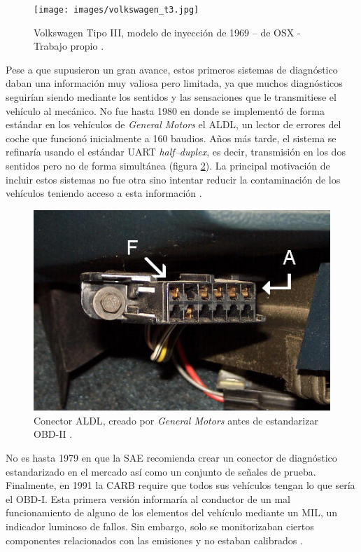 \begin{figure}[H]
  \centering
  \texttt{[image: images/volkswagen\_t3.jpg]}
  \caption{Volkswagen Tipo III, modelo de inyección de 1969 -- de OSX - Trabajo propio \cite{VolkswagenTipo2021}.}
  \label{fig:volkswagen_t3}
\end{figure}

Pese a que supusieron un gran avance, estos primeros sistemas de
diagnóstico daban una información muy valiosa pero limitada, ya que muchos
diagnósticos seguirían siendo mediante los sentidos y las sensaciones
que le transmitiese el vehículo al mecánico. No fue hasta 1980 en donde
se implementó de forma estándar en los vehículos de \textit{General Motors}
el \ac{ALDL}, un lector de errores del coche que funcionó inicialmente a
160 baudios. Años más tarde, el sistema se refinaría usando el estándar
\ac{UART} \textit{half--duplex}, es decir, transmisión en los dos sentidos pero
no de forma simultánea (figura \ref{fig:aldl}). La principal motivación de incluir estos sistemas no fue
otra sino intentar reducir la contaminación de los vehículos teniendo
acceso a esta información \cite{SistemaOBD2Historia}.

\begin{figure}[H]
  \centering
  \includegraphics[width=.75\linewidth]{images/aldl.jpg}
  \caption{Conector \ac{ALDL}, creado por \textit{General Motors} antes de
  estandarizar OBD-II \cite{ReferenceManualChapter}.}
  \label{fig:aldl}
\end{figure}

No es hasta 1979 en que la \ac{SAE} recomienda crear un conector de
diagnóstico estandarizado en el mercado así como un conjunto de señales
de prueba. Finalmente, en 1991 la \ac{CARB} require que todos sus
vehículos tengan lo que sería el \ac{OBD}-I. Esta primera versión informaría
al conductor de un mal funcionamiento de alguno de los elementos del
vehículo mediante un \ac{MIL}, un indicador luminoso de fallos. Sin
embargo, solo se monitorizaban ciertos componentes relacionados con las
emisiones y no estaban calibrados \cite{SistemaOBD2Historia}.


